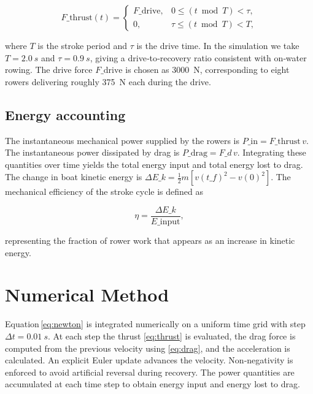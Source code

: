 \documentclass[11pt]{article}
\begin{document}
\begin{equation}
  F\_{\text{thrust}}(t) =
    \begin{cases}
      F\_\text{drive}, & 0 \le (t \bmod T) < \tau,\\
      0, & \tau \le (t \bmod T) < T,
    \end{cases}
  \label{eq:thrust}
\end{equation}

where \(T\) is the stroke period and \(\tau\) is the drive time.  In the
simulation we take \(T = \SI{2.0}{s}\) and \(\tau = \SI{0.9}{s}\), giving a
drive‑to‑recovery ratio consistent with on‑water rowing.  The drive force
\(F\_\text{drive}\) is chosen as \SI{3000}{N}, corresponding to eight rowers
delivering roughly \SI{375}{N} each during the drive.

\subsection{Energy accounting}

The instantaneous mechanical power supplied by the rowers is \(P\_\text{in} =
F\_{\text{thrust}}\,v\).  The instantaneous power dissipated by drag is
\(P\_\text{drag} = F\_d\,v\).  Integrating these quantities over time yields
the total energy input and total energy lost to drag.  The change in boat
kinetic energy is \(\Delta E\_k = \tfrac{1}{2} m [v(t\_f)^2 - v(0)^2]\).
The mechanical efficiency of the stroke cycle is defined as

\begin{equation}
  \eta = \frac{\Delta E\_k}{E\_\text{input}},
  \label{eq:efficiency}
\end{equation}

representing the fraction of rower work that appears as an increase in
kinetic energy.

\section{Numerical Method}

Equation\,\eqref{eq:newton} is integrated numerically on a uniform time grid
with step \(\Delta t = \SI{0.01}{s}\).  At each step the thrust
\eqref{eq:thrust} is evaluated, the drag force is computed from the
previous velocity using \eqref{eq:drag}, and the acceleration is
calculated.  An explicit Euler update advances the velocity.  Non‑negativity
is enforced to avoid artificial reversal during recovery.  The power
quantities are accumulated at each time step to obtain energy input and
energy lost to drag.
\end{document}
